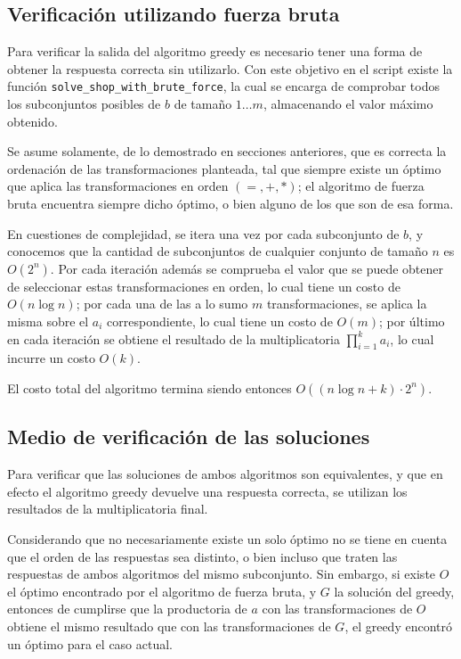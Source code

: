 \documentclass{article}
\theoremstyle{default}
\begin{document}
\subsection{Verificación utilizando fuerza bruta}
	Para verificar la salida del algoritmo greedy es necesario tener una forma de obtener la respuesta correcta sin utilizarlo. Con este objetivo en el script existe la función \texttt{solve\_shop\_with\_brute\_force}, la cual se encarga de comprobar todos los subconjuntos posibles de $b$ de tamaño $1 \dots m$, almacenando el valor máximo obtenido.

	Se asume solamente, de lo demostrado en secciones anteriores, que es correcta la ordenación de las transformaciones planteada, tal que siempre existe un óptimo que aplica las transformaciones en orden $(=, +, *)$; el algoritmo de fuerza bruta encuentra siempre dicho óptimo, o bien alguno de los que son de esa forma.

	En cuestiones de complejidad, se itera una vez por cada subconjunto de $b$, y conocemos que la cantidad de subconjuntos de cualquier conjunto de tamaño $n$ es $O(2^n)$. Por cada iteración además se comprueba el valor que se puede obtener de seleccionar estas transformaciones en orden, lo cual tiene un costo de $O(n \log n)$; por cada una de las a lo sumo $m$ transformaciones, se aplica la misma sobre el $a_i$ correspondiente, lo cual tiene un costo de $O(m)$; por último en cada iteración se obtiene el resultado de la multiplicatoria $\prod_{i=1}^k a_i$, lo cual incurre un costo $O(k)$.

	El costo total del algoritmo termina siendo entonces $O((n \log n + k) \cdot 2^n)$.
%
\subsection{Medio de verificación de las soluciones}
	Para verificar que las soluciones de ambos algoritmos son equivalentes, y que en efecto el algoritmo greedy devuelve una respuesta correcta, se utilizan los resultados de la multiplicatoria final.

	Considerando que no necesariamente existe un solo óptimo no se tiene en cuenta que el orden de las respuestas sea distinto, o bien incluso que traten las respuestas de ambos algoritmos del mismo subconjunto. Sin embargo, si existe $O$ el óptimo encontrado por el algoritmo de fuerza bruta, y $G$ la solución del greedy, entonces de cumplirse que la productoria de $a$ con las transformaciones de $O$ obtiene el mismo resultado que con las transformaciones de $G$, el greedy encontró un óptimo para el caso actual.
	
%
%
%
\end{document}
